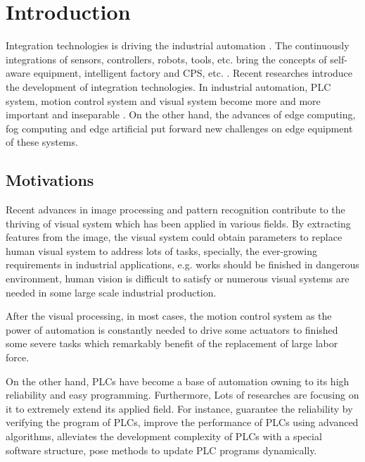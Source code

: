 \documentclass[journal,UTF8]{IEEEtran}
\begin{document}
\section{Introduction}
Integration technologies is driving the industrial automation \cite{Kazmierkowski2007Integration}. The continuously integrations of sensors, controllers, robots, tools, etc. bring the concepts of self-aware equipment, intelligent factory and CPS, etc. \cite{Wan2018An,Chekired2018Industrial}.  Recent researches \cite{Colombo2006An,Vaccaro2010An,Dean2017Integration} introduce the development of integration technologies. In industrial automation, PLC system,  motion control system and visual system become more and more important and inseparable \cite{Feng2002Integrating,Chang2006Motion,Feng2005Practical}. On the other hand, the advances of edge computing, fog computing and edge artificial\cite{Hu2017Fog,Hou2018Green,PaceAn} put forward new challenges on edge equipment of these systems.

\subsection{Motivations}
Recent advances in image processing and pattern recognition contribute to the thriving of visual system which has been applied in various fields. By extracting features from the image, the visual system could obtain parameters to replace human visual system to address lots of tasks, specially, the ever-growing requirements in industrial applications, e.g. works should be finished in dangerous environment, human vision is difficult to satisfy or numerous visual systems are needed in some large scale industrial production. 

After the visual processing, in most cases, the motion control system as the power of automation is constantly needed to drive some actuators to finished some severe tasks which remarkably benefit of the replacement of large labor force. 

On the other hand, PLCs have become a base of automation owning to its high reliability and easy programming\cite{Hossain2014Advanced}. Furthermore, Lots of researches are focusing on it to extremely extend its applied field. For instance, \cite{Jiang2013System,Jiang2013Bayesian} guarantee the reliability by verifying the program of PLCs, \cite{Gerk2006Advanced,Dominic2016PLC} improve the performance of PLCs using advanced algorithms, \cite{wu2018customized} alleviates the development complexity of PLCs with a special software structure, \cite{Sch2013Development} pose methods to update PLC programs dynamically.
\end{document}
